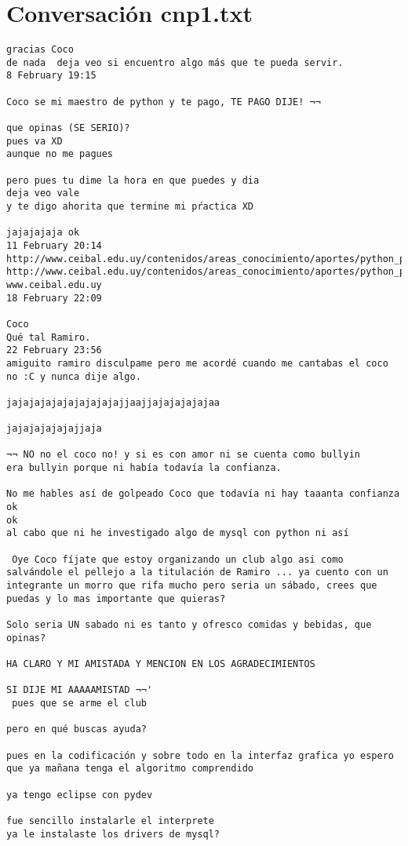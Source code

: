 \section{Conversaci\'on cnp1.txt}
\begin{verbatim}
gracias Coco
de nada  deja veo si encuentro algo más que te pueda servir.
8 February 19:15

Coco se mi maestro de python y te pago, TE PAGO DIJE! ¬¬

que opinas (SE SERIO)?
pues va XD
aunque no me pagues

pero pues tu dime la hora en que puedes y dia
deja veo vale
y te digo ahorita que termine mi pŕactica XD

jajajajaja ok
11 February 20:14
http://www.ceibal.edu.uy/contenidos/areas_conocimiento/aportes/python_para_todos.pdf
http://www.ceibal.edu.uy/contenidos/areas_conocimiento/aportes/python_para_todos.pdf
www.ceibal.edu.uy
18 February 22:09

Coco
Qué tal Ramiro.
22 February 23:56
amiguito ramiro disculpame pero me acordé cuando me cantabas el coco no :C y nunca dije algo.

jajajajajajajajajajajjaajjajajajajajaa

jajajajajajajjaja

¬¬ NO no el coco no! y si es con amor ni se cuenta como bullyin
era bullyin porque ni había todavía la confianza.

No me hables así de golpeado Coco que todavía ni hay taaanta confianza
ok
ok
al cabo que ni he investigado algo de mysql con python ni así 

 Oye Coco fíjate que estoy organizando un club algo asi como salvándole el pellejo a la titulación de Ramiro ... ya cuento con un integrante un morro que rifa mucho pero seria un sábado, crees que puedas y lo mas importante que quieras?

Solo seria UN sabado ni es tanto y ofresco comidas y bebidas, que opinas?

HA CLARO Y MI AMISTADA Y MENCION EN LOS AGRADECIMIENTOS

SI DIJE MI AAAAAMISTAD ¬¬'
 pues que se arme el club

pero en qué buscas ayuda?

pues en la codificación y sobre todo en la interfaz grafica yo espero que ya mañana tenga el algoritmo comprendido

ya tengo eclipse con pydev

fue sencillo instalarle el interprete 
ya le instalaste los drivers de mysql?


\end{verbatim}
